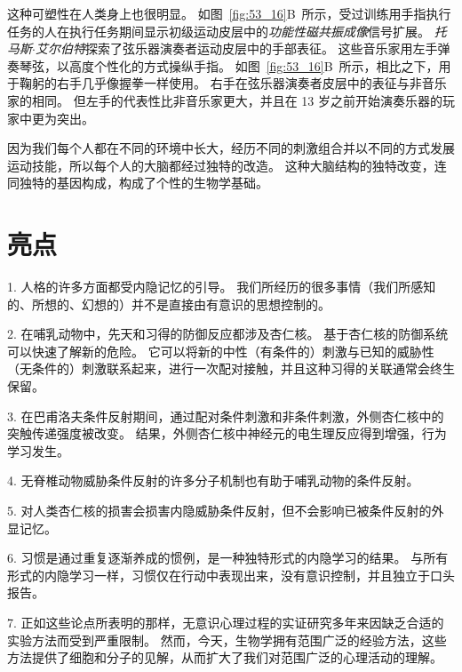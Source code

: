 这种可塑性在人类身上也很明显。
如图~\ref{fig:53_16}B~所示，受过训练用手指执行任务的人在执行任务期间显示初级运动皮层中的\textit{功能性磁共振成像}信号扩展。
\textit{托马斯$\cdot$艾尔伯特}探索了弦乐器演奏者运动皮层中的手部表征。
这些音乐家用左手弹奏琴弦，以高度个性化的方式操纵手指。
如图~\ref{fig:53_16}B~所示，相比之下，用于鞠躬的右手几乎像握拳一样使用。
右手在弦乐器演奏者皮层中的表征与非音乐家的相同。
但左手的代表性比非音乐家更大，并且在 13 岁之前开始演奏乐器的玩家中更为突出。


因为我们每个人都在不同的环境中长大，经历不同的刺激组合并以不同的方式发展运动技能，所以每个人的大脑都经过独特的改造。
这种大脑结构的独特改变，连同独特的基因构成，构成了个性的生物学基础。



\section{亮点}

1. 人格的许多方面都受内隐记忆的引导。
我们所经历的很多事情（我们所感知的、所想的、幻想的）并不是直接由有意识的思想控制的。


2. 在哺乳动物中，先天和习得的防御反应都涉及杏仁核。
基于杏仁核的防御系统可以快速了解新的危险。
它可以将新的中性（有条件的）刺激与已知的威胁性（无条件的）刺激联系起来，进行一次配对接触，并且这种习得的关联通常会终生保留。


3. 在巴甫洛夫条件反射期间，通过配对条件刺激和非条件刺激，外侧杏仁核中的突触传递强度被改变。
结果，外侧杏仁核中神经元的电生理反应得到增强，行为学习发生。


4. 无脊椎动物威胁条件反射的许多分子机制也有助于哺乳动物的条件反射。


5. 对人类杏仁核的损害会损害内隐威胁条件反射，但不会影响已被条件反射的外显记忆。


6. 习惯是通过重复逐渐养成的惯例，是一种独特形式的内隐学习的结果。
与所有形式的内隐学习一样，习惯仅在行动中表现出来，没有意识控制，并且独立于口头报告。


7. 正如这些论点所表明的那样，无意识心理过程的实证研究多年来因缺乏合适的实验方法而受到严重限制。
然而，今天，生物学拥有范围广泛的经验方法，这些方法提供了细胞和分子的见解，从而扩大了我们对范围广泛的心理活动的理解。


